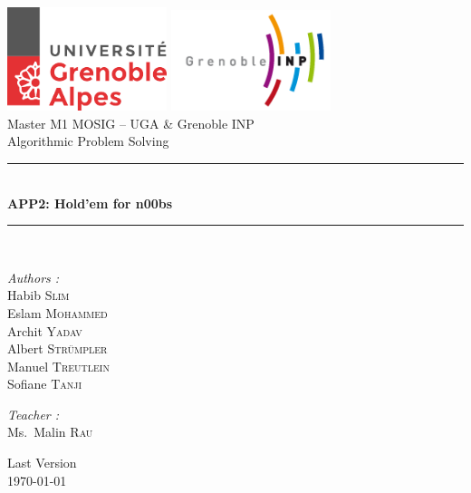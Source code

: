\documentclass[a4paper,12pt,fleqn]{article}
\begin{document}

\begin{titlepage}
\begin{center}

\includegraphics[width=0.35\textwidth]{logo-uga.png}
\includegraphics[width=0.35\textwidth]{logoinp.png} \\[1cm]

{\large Master M1 MOSIG – UGA \& Grenoble INP} \\[0.8cm]
{\large Algorithmic Problem Solving}\\[0.5cm]

\rule{\linewidth}{0.5mm} \\[0.4cm]
{ \huge \bfseries APP2: Hold’em for n00bs \\[0.4cm] }
\rule{\linewidth}{0.5mm} \\[1.5cm]

\noindent
\begin{minipage}{0.4\textwidth}
  \begin{flushleft} \large
    \emph{Authors :}\\
    Habib \textsc{Slim}\\
    Eslam \textsc{Mohammed}\\
    Archit \textsc{Yadav}\\
    Albert \textsc{Strümpler}\\
    Manuel \textsc{Treutlein}\\
    Sofiane \textsc{Tanji}
  \end{flushleft}
\end{minipage}%
\begin{minipage}{0.4\textwidth}
  \begin{flushright} \large
    \emph{Teacher :} \\
    Ms.~Malin \textsc{Rau}\\
  \end{flushright}
\end{minipage}

\vfill

{\large Last Version \\ \today}

\end{center}
\end{titlepage}
\end{document}
